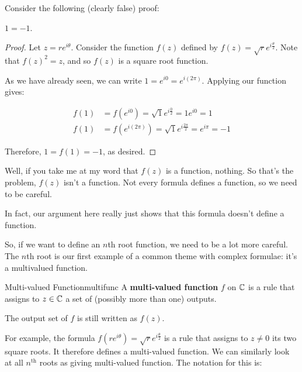 \begin{ex}{}{} Consider the following (clearly false) proof:

\begin{claim} $1 = -1$.\end{claim}

\begin{proof} Let $z = re^{i\theta}$. Consider the function $f(z)$ defined by $f(z) = \sqrt{r}e^{i\frac{\theta}{2}}$. Note that $f(z)^2 = z$, and so $f(z)$ is a square root function.

As we have already seen, we can write $1 = e^{i0} = e^{i(2\pi)}$. Applying our function gives:


\begin{align*}f(1) &= f(e^{i0}) = \sqrt{1}e^{i\frac{0}{2}} = 1e^{i0} = 1\\
f(1) &= f(e^{i(2\pi)}) = \sqrt{1}e^{i\frac{2\pi}{2}} = e^{i\pi} = -1\end{align*}

Therefore, $1 = f(1) = -1$, as desired.\end{proof}



Well, if you take me at my word that $f(z)$ is a function, nothing. So that's the problem, $f(z)$ isn't a function. Not every formula defines a function, so we need to be careful.

In fact, our argument here really just shows that this formula doesn't define a function.

\end{ex}


So, if we want to define an $n$th root function, we need to be a lot more careful. The $n$th root is our first example of a common theme with complex formulae: it's a multivalued function.

\begin{defbo}{Multi-valued Function}{multifunc} A {\bf multi-valued function} $f$ on $\mathbb{C}$ is a rule that assigns to $z \in \mathbb{C}$ a set of (possibly more than one) outputs.

The output set of $f$ is still written as $f(z)$.
\end{defbo}

For example, the formula $f(re^{i\theta}) = \sqrt{r}e^{i\frac{\theta}{2}}$ is a rule that assigns to $z\ne 0$ its two square roots. It therefore defines a multi-valued function. We can similarly look at all $n^\text{th}$ roots as giving multi-valued function. The notation for this is:

